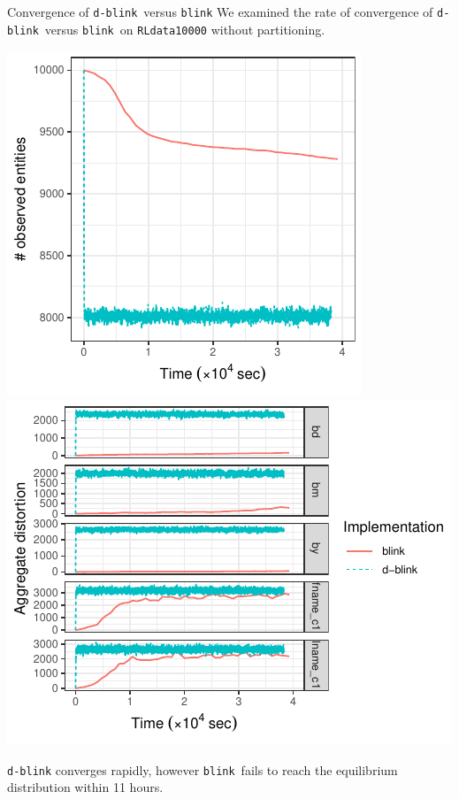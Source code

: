 \documentclass[compress]{beamer}
\newcommand{\blink}{\texttt{blink}}
\newcommand{\dblink}{\texttt{d-blink}}
\newcommand{\1}[1]{\mathbb{I}\!\left[#1\right]} %
\theoremstyle{plain}
\begin{document}
\begin{frame}{Convergence of \dblink\ versus \blink}
  We examined the rate of convergence of \dblink\ versus \blink\ 
  on \texttt{RLdata10000} without partitioning.
  
  \begin{center}
    \includegraphics[height=0.45\textheight]{figures/convergence-num-ent-blink-dblink.pdf}
    \hfill
    \includegraphics[height=0.45\textheight]{figures/convergence-agg-dist-blink-dblink.pdf}
  \end{center}

  \texttt{d-blink} converges rapidly, however \blink\ fails to reach 
  the equilibrium distribution within 11 hours.
\end{frame}
\end{document}
